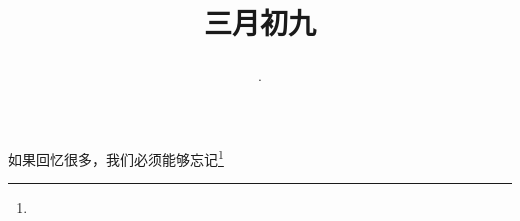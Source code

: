 \title{\date[d=17,m=4,y=2024][year:cn-y,年,month:cn,day:cn,日,·,weekday]·三月初九 }
如果回忆很多，我们必须能够忘记\footnote{ }

